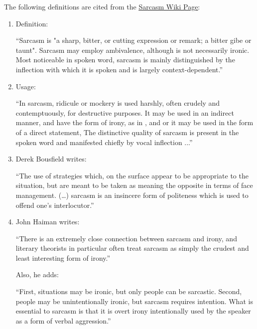 The following definitions are cited from the \href{https://en.wikipedia.org/wiki/Sarcasm}{\ul{Sarcasm Wiki Page}}:

\begin{enumerate}
    \item Definition:
    \begin{center}
        ``Sarcasm is "a sharp, bitter, or cutting expression or remark; a bitter gibe or taunt". Sarcasm may employ ambivalence, although is not necessarily ironic. Most noticeable in spoken word, sarcasm is mainly distinguished by the inflection with which it is spoken and is largely context-dependent.''
    \end{center}


    \item Usage:
    \begin{center}
        ``In sarcasm, ridicule or mockery is used harshly, often crudely and contemptuously, for destructive purposes. It may be used in an indirect manner, and have the form of irony, as in ,  and  or it may be used in the form of a direct statement,  The distinctive quality of sarcasm is present in the spoken word and manifested chiefly by vocal inflection ...''
    \end{center}
    
    \item Derek Bousfield writes:
    \begin{center}
        ``The use of strategies which, on the surface appear to be appropriate to the situation, but are meant to be taken as meaning the opposite in terms of face management. (\dots) sarcasm is an insincere form of politeness which is used to offend one's interlocutor.''
    \end{center}

    \item John Haiman writes: 
    \begin{center}
        ``There is an extremely close connection between sarcasm and irony, and literary theorists in particular often treat sarcasm as simply the crudest and least interesting form of irony.''    
    \end{center}
    Also, he adds:
    \begin{center}
        ``First, situations may be ironic, but only people can be sarcastic. Second, people may be unintentionally ironic, but sarcasm requires intention. What is essential to sarcasm is that it is overt irony intentionally used by the speaker as a form of verbal aggression.''        
    \end{center}


\end{enumerate}
